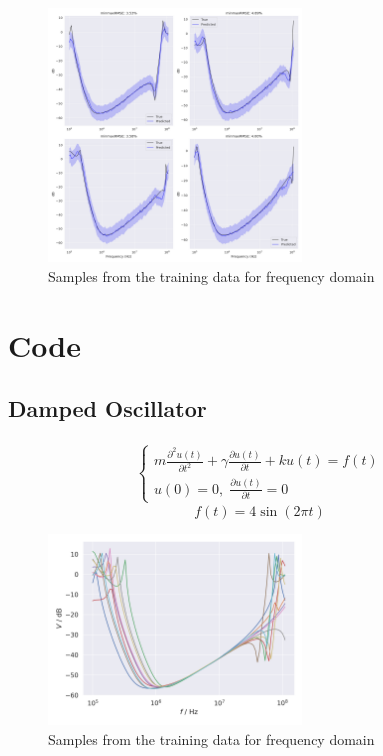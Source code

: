 \documentclass{article}
\begin{document}
\begin{figure}[h]
    \centering
    \includegraphics[width=0.6\textwidth]{plots/prediction_transformer.png}
    \caption{Samples from the training data for frequency domain}
    \label{fig:training_samples}
\end{figure}
\section{Code}
%

\subsection{Damped Oscillator}
\begin{equation}
    \begin{aligned}
    {\displaystyle {\begin{cases}
        m\frac{\partial^2 u(t)}{\partial t^2} + \gamma \frac{\partial u(t)}{\partial t} + k u(t) = f(t) \\ u(0) = 0, \; \frac{\partial u(t)}{\partial t} = 0\end{cases}}}
    \end{aligned}
\end{equation}
\begin{equation}
    f(t) = 4 \sin(2\pi t)
\end{equation}
\begin{figure}[h]
    \centering
    \includegraphics[width=0.6\textwidth]{plots/data_samples.png}
    \caption{Samples from the training data for frequency domain}
    \label{fig:training_samples}
\end{figure}
\newpage
\printbibliography
\end{document}

